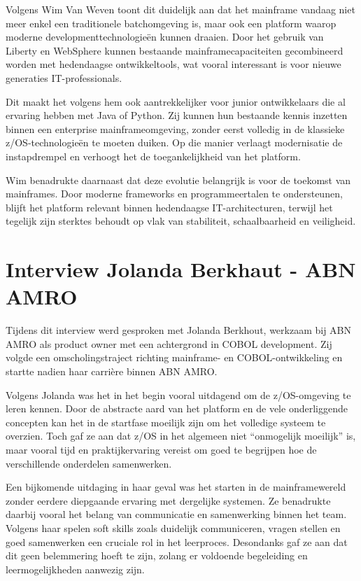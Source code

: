 Volgens Wim Van Weven toont dit duidelijk aan dat het mainframe vandaag niet meer enkel een traditionele batchomgeving is, maar ook een platform waarop moderne developmenttechnologieën kunnen draaien. Door het gebruik van Liberty en WebSphere kunnen bestaande mainframecapaciteiten gecombineerd worden met hedendaagse ontwikkeltools, wat vooral interessant is voor nieuwe generaties IT-professionals.

Dit maakt het volgens hem ook aantrekkelijker voor junior ontwikkelaars die al ervaring hebben met Java of Python. Zij kunnen hun bestaande kennis inzetten binnen een enterprise mainframeomgeving, zonder eerst volledig in de klassieke z/OS-technologieën te moeten duiken. Op die manier verlaagt modernisatie de instapdrempel en verhoogt het de toegankelijkheid van het platform.

Wim benadrukte daarnaast dat deze evolutie belangrijk is voor de toekomst van mainframes. Door moderne frameworks en programmeertalen te ondersteunen, blijft het platform relevant binnen hedendaagse IT-architecturen, terwijl het tegelijk zijn sterktes behoudt op vlak van stabiliteit, schaalbaarheid en veiligheid.

\section{Interview Jolanda Berkhaut - ABN AMRO}

Tijdens dit interview werd gesproken met Jolanda Berkhout, werkzaam bij ABN AMRO als product owner met een achtergrond in COBOL development. Zij volgde een omscholingstraject richting mainframe- en COBOL-ontwikkeling en startte nadien haar carrière binnen ABN AMRO.

Volgens Jolanda was het in het begin vooral uitdagend om de z/OS-omgeving te leren kennen. Door de abstracte aard van het platform en de vele onderliggende concepten kan het in de startfase moeilijk zijn om het volledige systeem te overzien. Toch gaf ze aan dat z/OS in het algemeen niet “onmogelijk moeilijk” is, maar vooral tijd en praktijkervaring vereist om goed te begrijpen hoe de verschillende onderdelen samenwerken.

Een bijkomende uitdaging in haar geval was het starten in de mainframewereld zonder eerdere diepgaande ervaring met dergelijke systemen. Ze benadrukte daarbij vooral het belang van communicatie en samenwerking binnen het team. Volgens haar spelen soft skills zoals duidelijk communiceren, vragen stellen en goed samenwerken een cruciale rol in het leerproces. Desondanks gaf ze aan dat dit geen belemmering hoeft te zijn, zolang er voldoende begeleiding en leermogelijkheden aanwezig zijn.

